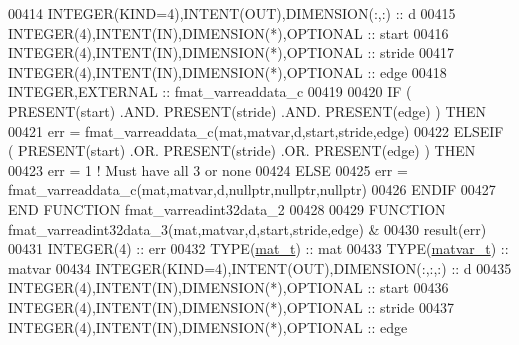 \begin{DoxyCode}
00414     \textcolor{keywordtype}{INTEGER(KIND=4)},\textcolor{keywordtype}{INTENT(OUT)},\textcolor{keywordtype}{DIMENSION(:,:)}  :: d
00415     \textcolor{keywordtype}{INTEGER(4)},\textcolor{keywordtype}{INTENT(IN)},\textcolor{keywordtype}{DIMENSION(*)},\textcolor{keywordtype}{OPTIONAL} :: start
00416     \textcolor{keywordtype}{INTEGER(4)},\textcolor{keywordtype}{INTENT(IN)},\textcolor{keywordtype}{DIMENSION(*)},\textcolor{keywordtype}{OPTIONAL} :: stride
00417     \textcolor{keywordtype}{INTEGER(4)},\textcolor{keywordtype}{INTENT(IN)},\textcolor{keywordtype}{DIMENSION(*)},\textcolor{keywordtype}{OPTIONAL} :: edge
00418     \textcolor{keywordtype}{INTEGER},\textcolor{keywordtype}{EXTERNAL}                            :: fmat\_varreaddata\_c
00419 
00420     \textcolor{keywordflow}{IF} ( \textcolor{keyword}{PRESENT}(start) .AND. \textcolor{keyword}{PRESENT}(stride) .AND. \textcolor{keyword}{PRESENT}(edge) ) \textcolor{keywordflow}{THEN}
00421         err = fmat\_varreaddata\_c(mat,matvar,d,start,stride,edge)
00422     \textcolor{keywordflow}{ELSEIF} ( \textcolor{keyword}{PRESENT}(start) .OR. \textcolor{keyword}{PRESENT}(stride) .OR. \textcolor{keyword}{PRESENT}(edge) ) \textcolor{keywordflow}{THEN}
00423         err = 1    \textcolor{comment}{! Must have all 3 or none}
00424     \textcolor{keywordflow}{ELSE}
00425         err = fmat\_varreaddata\_c(mat,matvar,d,nullptr,nullptr,nullptr)
00426 \textcolor{keywordflow}{    ENDIF}
00427 \textcolor{keyword}{END FUNCTION }fmat\_varreadint32data\_2
00428 
00429 \textcolor{keyword}{FUNCTION }fmat\_varreadint32data\_3(mat,matvar,d,start,stride,edge) &
00430                                                        result(err)
00431     \textcolor{keywordtype}{INTEGER(4)}                                   :: err
00432     \textcolor{keywordtype}{TYPE}(\hyperlink{group___m_a_t_gab0fc888f5a5d79943b16284b1f91c2e8}{mat\_t})                                  :: mat
00433     \textcolor{keywordtype}{TYPE}(\hyperlink{group___m_a_t_structmatvar__t}{matvar\_t})                               :: matvar
00434     \textcolor{keywordtype}{INTEGER(KIND=4)},\textcolor{keywordtype}{INTENT(OUT)},\textcolor{keywordtype}{DIMENSION(:,:,:)} :: d
00435     \textcolor{keywordtype}{INTEGER(4)},\textcolor{keywordtype}{INTENT(IN)},\textcolor{keywordtype}{DIMENSION(*)},\textcolor{keywordtype}{OPTIONAL}  :: start
00436     \textcolor{keywordtype}{INTEGER(4)},\textcolor{keywordtype}{INTENT(IN)},\textcolor{keywordtype}{DIMENSION(*)},\textcolor{keywordtype}{OPTIONAL}  :: stride
00437     \textcolor{keywordtype}{INTEGER(4)},\textcolor{keywordtype}{INTENT(IN)},\textcolor{keywordtype}{DIMENSION(*)},\textcolor{keywordtype}{OPTIONAL}  :: edge

\end{DoxyCode}

